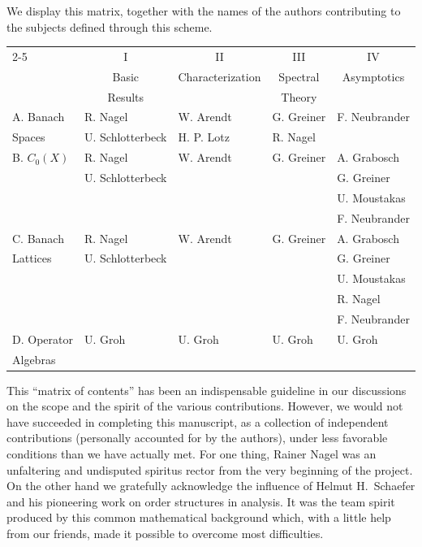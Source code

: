  We display this matrix, together with the names of the authors contributing to the subjects defined through this scheme.
\begin{center}
\begin{tabularx}{\textwidth}{l|X|X|X|X|}
\cline{2-5}
  & \multicolumn{1}{|c|}{I} & \multicolumn{1}{|c|}{II} & \multicolumn{1}{|c|}{III} & \multicolumn{1}{|c|}{IV} \\
  & \multicolumn{1}{|c|}{Basic} & \multicolumn{1}{|c|}{Characterization} & \multicolumn{1}{|c|}{Spectral} & \multicolumn{1}{|c|}{Asymptotics} \\
  & \multicolumn{1}{|c|}{Results} & \multicolumn{1}{|c|}{} & \multicolumn{1}{|c|}{Theory} & \multicolumn{1}{|c|}{} \\
 \hline
 \multicolumn{1}{|l|}{A. Banach} & R. Nagel & W. Arendt & G. Greiner & F. Neubrander \\
 \multicolumn{1}{|l|}{Spaces} & U. Schlotterbeck & H. P. Lotz & R. Nagel & \\
 \hline
 \multicolumn{1}{|l|}{B. $C_0(X)$} & R. Nagel & W. Arendt & G. Greiner & A. Grabosch \\
 \multicolumn{1}{|l|}{} & U. Schlotterbeck & & & G. Greiner \\
 \multicolumn{1}{|l|}{} & & & & U. Moustakas \\
 \multicolumn{1}{|l|}{} & & & & F. Neubrander \\
 \hline
 \multicolumn{1}{|l|}{C. Banach} & R. Nagel & W. Arendt & G. Greiner & A. Grabosch \\
 \multicolumn{1}{|l|}{Lattices} & U. Schlotterbeck & & & G. Greiner \\
 \multicolumn{1}{|l|}{} & & & & U. Moustakas \\
 \multicolumn{1}{|l|}{} & & & & R. Nagel \\
 \multicolumn{1}{|l|}{} & & & & F. Neubrander \\
 \hline
 \multicolumn{1}{|l|}{D. Operator} & U. Groh & U. Groh & U. Groh & U. Groh \\
 \multicolumn{1}{|l|}{Algebras} & & & & \\
 \hline
 \end{tabularx}
 \end{center}
 \bigskip
 This \enquote{matrix of contents} has been an indispensable guideline in our discussions on the scope and the spirit of the various contributions. 
 However, we would not have succeeded in completing this manuscript, as a collection of independent contributions (personally accounted for by the authors), under less favorable conditions than we have actually met. 
 For one thing, Rainer Nagel was an unfaltering and undisputed spiritus rector from the very beginning of the project. 
 On the other hand we gratefully acknowledge the influence of Helmut H.~Schaefer and his pioneering work on order structures in analysis. 
 It was the team spirit produced by this common mathematical background which, with a little help from our friends, made it possible to overcome most difficulties.
 
